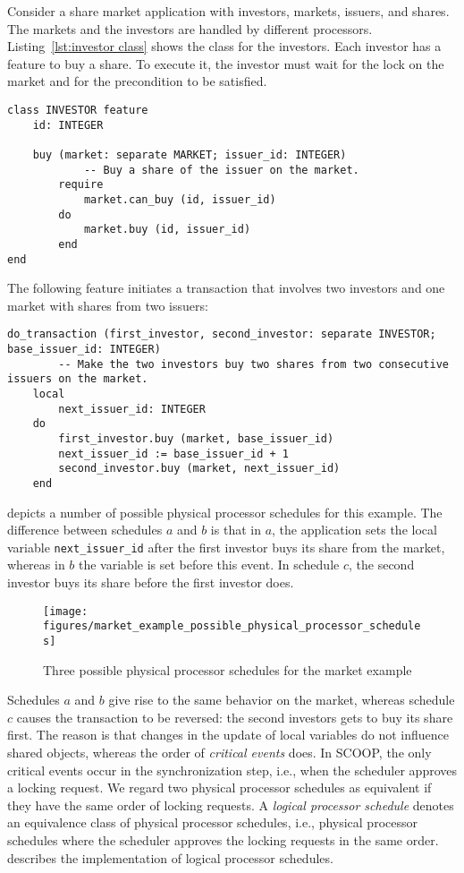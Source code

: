 Consider a share market application with investors, markets, issuers, and shares. The markets and the investors are handled by different processors. Listing~\ref{lst:investor class} shows the class for the investors. Each investor has a feature to buy a share. To execute it, the investor must wait for the lock on the market and for the precondition to be satisfied.
\begin{lstlisting}[caption=Investor class, label=lst:investor class, language=SCOOP]
class INVESTOR feature
	id: INTEGER
	
	buy (market: separate MARKET; issuer_id: INTEGER)
			-- Buy a share of the issuer on the market.
		require
			market.can_buy (id, issuer_id)
		do
			market.buy (id, issuer_id)
		end
end
\end{lstlisting}
The following feature initiates a transaction that involves two investors and one market with shares from two issuers:
\begin{lstlisting}[language=SCOOP]
do_transaction (first_investor, second_investor: separate INVESTOR; base_issuer_id: INTEGER)
		-- Make the two investors buy two shares from two consecutive issuers on the market.
	local
		next_issuer_id: INTEGER	
	do
		first_investor.buy (market, base_issuer_id)
		next_issuer_id := base_issuer_id + 1
		second_investor.buy (market, next_issuer_id)
	end
\end{lstlisting}

 depicts a number of possible physical processor schedules for this example. The difference between schedules $a$ and $b$ is that in $a$, the application sets the local variable \lstinline[language=SCOOP]!next_issuer_id! after the first investor buys its share from the market, whereas in $b$ the variable is set before this event. In schedule $c$, the second investor buys its share before the first investor does.
\begin{figure}[ht]
  \centering
  \texttt{[image: figures/market\_example\_possible\_physical\_processor\_schedules]}
  \caption{Three possible physical processor schedules for the market example}
  \label{fig:market example possible physical processor schedules}
\end{figure}
Schedules $a$ and $b$ give rise to the same behavior on the market, whereas schedule $c$ causes the transaction to be reversed: the second investors gets to buy its share first. The reason is that changes in the update of local variables do not influence shared objects, whereas the order of \emph{critical events} does. In SCOOP, the only critical events occur in the synchronization step, i.e., when the scheduler approves a locking request. We regard two physical processor schedules as equivalent if they have the same order of locking requests. A \emph{logical processor schedule} denotes an equivalence class of physical processor schedules, i.e., physical processor schedules where the scheduler approves the locking requests in the same order.  describes the implementation of logical processor schedules.

